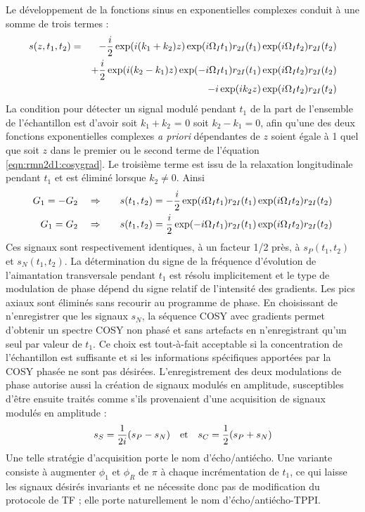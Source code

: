 Le développement de la fonctions sinus en exponentielles complexes conduit à 
une somme de trois termes :
\begin{eqnarray}
s(z, t_1, t_2) & = &
-\frac{i}{2} \exp(i(k_1 + k_2)z) \exp(i\Omega_I t_1) r_{2I}(t_1) \exp(i\Omega_I t_2) r_{2I}(t_2) \nonumber\\
& & +
\frac{i}{2} \exp(i(k_2 - k_1)z) \exp(-i\Omega_I t_1) r_{2I}(t_1) \exp(i\Omega_I t_2) r_{2I}(t_2) \nonumber\\
& & -
\label{eqn:rmn2d1:cosygrad}
i \exp(i k_2 z) \exp(i\Omega_I t_2) r_{2I}(t_2)
\end{eqnarray}
La condition pour détecter un signal modulé pendant $t_1$
de la part de l'ensemble de l'échantillon est d'avoir soit $k_1 + k_2$ = 0
soit $k_2 - k_1 = 0$, afin qu'une des deux fonctions exponentielles complexes
\emph{a priori} dépendantes de $z$ soient égale à 1 quel que soit $z$
dans le premier ou le second terme de l'équation \ref{eqn:rmn2d1:cosygrad}.
Le troisième terme est issu de la relaxation longitudinale pendant $t_1$
et est éliminé lorsque $k_2 \ne 0$.
Ainsi
\begin{eqnarray}
G_1 = -G_2 \quad & \Rightarrow & \quad
s(t_1, t_2) = -\frac{i}{2} \exp(i\Omega_I t_1) r_{2I}(t_1) \exp(i\Omega_I t_2) r_{2I}(t_2) \\
G_1 = G_2 \quad & \Rightarrow & \quad
s(t_1, t_2) = \frac{i}{2} \exp(-i\Omega_I t_1) r_{2I}(t_1) \exp(i\Omega_I t_2) r_{2I}(t_2)
\end{eqnarray}
Ces signaux sont respectivement identiques, à un facteur 1/2 près, 
à $s_P(t_1, t_2)$ et $s_N(t_1, t_2)$.
La détermination du signe de la fréquence d'évolution de l'aimantation transversale
pendant $t_1$ est résolu implicitement et le type de modulation de phase
dépend du signe relatif de l'intensité des gradients.
Les pics axiaux sont éliminés sans recourir au programme de phase.
En choisissant de n'enregistrer que les signaux $s_N$, la séquence COSY
avec gradients permet d'obtenir un spectre COSY non phasé et sans artefacts en n'enregistrant
qu'un seul {\FID} par valeur de $t_1$.
Ce choix est tout-à-fait acceptable si la concentration de l'échantillon est suffisante
et si les informations spécifiques apportées par la COSY phasée ne sont pas désirées.
L'enregistrement des deux modulations de phase autorise aussi la création de
signaux modulés en amplitude, susceptibles d'être ensuite traités
comme s'ils provenaient d'une acquisition de signaux modulés en amplitude :
\begin{equation}
s_S = \frac{1}{2i}(s_P - s_N) \quad \mbox{et} \quad s_C = \frac{1}{2}(s_P + s_N)
\end{equation}
Une telle stratégie d'acquisition porte le nom d'écho/antiécho.
Une variante consiste à augmenter $\phi_1$ et $\phi_R$ de $\pi$ à chaque incrémentation
de $t_1$, ce qui laisse les signaux désirés invariants et ne nécessite donc pas de
modification du protocole de TF ; elle porte
naturellement le nom d'écho/antiécho-TPPI.

